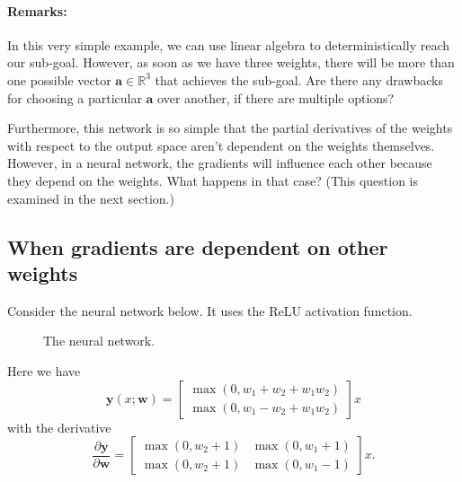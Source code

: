 \documentclass{article}
\let\vec\mathbf
\begin{document}
\paragraph{Remarks:}
In this very simple example, we can use linear algebra to deterministically reach our sub-goal. 
However, as soon as we have three weights, there will be more than one possible vector $\vec{a} \in \mathbb{R}^3$ that achieves the sub-goal. 
Are there any drawbacks for choosing a particular $\vec{a}$ over another, if there are multiple options?

Furthermore, this network is so simple that the partial derivatives of the weights with respect to the output space aren't dependent on the weights themselves. However, in a  neural network, the gradients will influence each other because they depend on the weights. What happens in that case? (This question is examined in the next section.)

\subsection{When gradients are dependent on other weights}
Consider the neural network below. It uses the ReLU activation function.

\begin{figure}[h]
    \begin{center}
    \end{center}
    \caption{The neural network.}
\end{figure}

Here we have
\begin{equation*}
    \vec{y}(x; \vec{w}) = 
    \begin{bmatrix}
        \max \left( 0, w_1 + w_2 + w_1 w_2 \right) \\
        \max \left( 0, w_1 - w_2 + w_1 w_2 \right)
    \end{bmatrix}
    x
\end{equation*}
with the derivative
\begin{equation*}
    \frac{\partial \vec{y}}{\partial \vec{w}}
    =
    \begin{bmatrix}
        \max(0, w_2 + 1) & \max(0, w_1 + 1) \\
        \max(0, w_2 + 1) & \max(0, w_1 - 1)
    \end{bmatrix}
    x.
\end{equation*}
\end{document}
